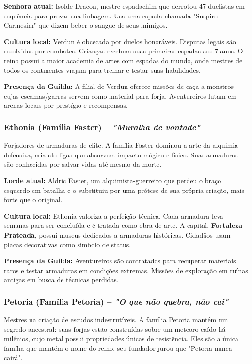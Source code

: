 \textbf{\ringmfamily Senhora atual:} Isolde Dracon, mestre-espadachim que derrotou 47 duelistas em sequência para provar sua linhagem. Usa uma espada chamada "Suspiro Carmesim" que dizem beber o sangue de seus inimigos.

\textbf{\ringmfamily Cultura local:} Verdun é obcecada por duelos honoráveis. Disputas legais são resolvidas por combates. Crianças recebem suas primeiras espadas aos 7 anos. O reino possui a maior academia de artes com espadas do mundo, onde mestres de todos os continentes viajam para treinar e testar suas habilidades.

\textbf{\ringmfamily Presença da Guilda:} A filial de Verdun oferece missões de caça a monstros cujas escamas/garras servem como material para forja. Aventureiros lutam em arenas locais por prestígio e recompensas.

\subsubsection*{Ethonia (Família Faster) – \textit{"Muralha de vontade"}}
Forjadores de armaduras de elite. A família Faster dominou a arte da alquimia defensiva, criando ligas que absorvem impacto mágico e físico. Suas armaduras são conhecidas por salvar vidas até mesmo da morte.

\textbf{\ringmfamily Lorde atual:} Aldric Faster, um alquimista-guerreiro que perdeu o braço esquerdo em batalha e o substituiu por uma prótese de sua própria criação, mais forte que o original.

\textbf{\ringmfamily Cultura local:} Ethonia valoriza a perfeição técnica. Cada armadura leva semanas para ser concluída e é tratada como obra de arte. A capital, \textbf{Fortaleza Prateada}, possui museus dedicados a armaduras históricas. Cidadãos usam placas decorativas como símbolo de status.

\textbf{\ringmfamily Presença da Guilda:} Aventureiros são contratados para recuperar materiais raros e testar armaduras em condições extremas. Missões de exploração em ruínas antigas em busca de técnicas perdidas.

\subsubsection*{Petoria (Família Petoria) – \textit{"O que não quebra, não cai"}}
Mestres na criação de escudos indestrutíveis. A família Petoria mantém um segredo ancestral: suas forjas estão construídas sobre um meteoro caído há milênios, cujo metal possui propriedades únicas de resistência. Eles são a única família que mantém o nome do reino, seu fundador jurou que "Petoria nunca cairá".

